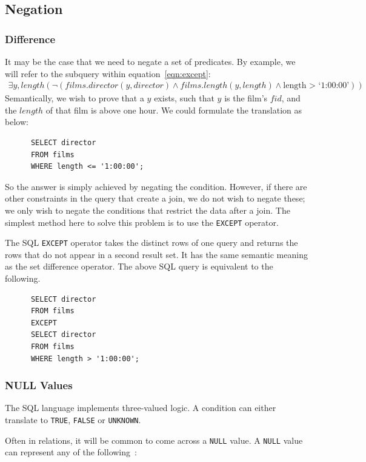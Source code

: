 \documentclass[a4paper, 11pt]{article}
\begin{document}
  \subsection{Negation}
    \subsubsection{Difference}
      \label{sec:except}
      It may be the case that we need to negate a set of predicates. By example,
      we will refer to the subquery within equation~\ref{eqn:except}:
      \begin{multline}
        \exists y,length(\lnot(films.director(y, director) \land films.length(y,
        length) \land \text{length > `1:00:00'}))
      \end{multline}
      Semantically, we wish to prove that a $y$ exists, such that $y$ is the
      film's $fid$, and the $length$ of that film is above one hour. We could
      formulate the translation as below:
      \begin{verbatim}
      SELECT director
      FROM films
      WHERE length <= '1:00:00';
      \end{verbatim}
      So the answer is simply achieved by negating the condition. However, if
      there are other constraints in the query that create a join, we do not
      wish to negate these; we only wish to negate the conditions that restrict
      the data after a join. The simplest method here to solve this problem is
      to use the \texttt{EXCEPT} operator.

      The SQL \texttt{EXCEPT} operator takes the distinct rows of one query and
      returns the rows that do not appear in a second result
      set\cite{wiki:EXCEPT}. It has the same semantic meaning as the set
      difference operator. The above SQL query is equivalent to the following.
      \begin{verbatim}
      SELECT director
      FROM films
      EXCEPT
      SELECT director
      FROM films
      WHERE length > '1:00:00';
      \end{verbatim}
    \subsubsection{NULL Values}
      The SQL language implements three-valued logic. A condition can either
      translate to \texttt{TRUE}, \texttt{FALSE} or \texttt{UNKNOWN}.

      Often in relations, it will be common to come across a \texttt{NULL}
      value. A \texttt{NULL} value can represent any of the
      following~\cite{pmbNULL}:
\end{document}
